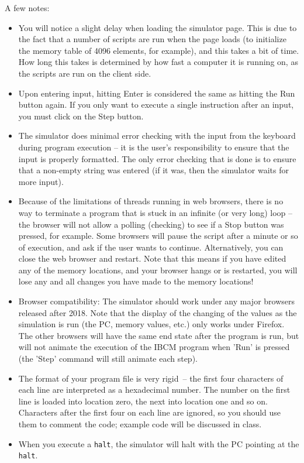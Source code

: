 A few notes:

\begin{itemize}

\item You will notice a slight delay when loading the simulator page.
  This is due to the fact that a number of scripts are run when the
  page loads (to initialize the memory table of 4096 elements, for
  example), and this takes a bit of time. How long this takes is
  determined by how fast a computer it is running on, as the scripts
  are run on the client side.

\item Upon entering input, hitting Enter is considered the same as
  hitting the Run button again. If you only want to execute a single
  instruction after an input, you must click on the Step button.

\item The simulator does minimal error checking with the input from
  the keyboard during program execution -- it is the user's
  responsibility to ensure that the input is properly formatted. The
  only error checking that is done is to ensure that a non-empty
  string was entered (if it was, then the simulator waits for more
  input).

\item Because of the limitations of threads running in web browsers,
  there is no way to terminate a program that is stuck in an infinite
  (or very long) loop -- the browser will not allow a polling
  (checking) to see if a Stop button was pressed, for example. Some
  browsers will pause the script after a minute or so of execution,
  and ask if the user wants to continue. Alternatively, you can close
  the web browser and restart. Note that this means if you have edited
  any of the memory locations, and your browser hangs or is restarted,
  you will lose any and all changes you have made to the memory
  locations!

\item Browser compatibility: The simulator should work under any major
  browsers released after 2018. Note that the display of the changing
  of the values as the simulation is run (the PC, memory values, etc.)
  only works under Firefox. The other browsers will have the same end
  state after the program is run, but will not animate the execution
  of the IBCM program when 'Run' is pressed (the 'Step' command will
  still animate each step).

\item The format of your program file is very rigid~-- the first four
  characters of each line are interpreted as a hexadecimal number. The
  number on the first line is loaded into location zero, the next into
  location one and so on. Characters after the first four on each line
  are ignored, so you should use them to comment the code; example
  code will be discussed in class.

\item When you execute a {\tt halt}, the simulator will halt with the PC
  pointing at the {\tt halt}.

\end{itemize}

